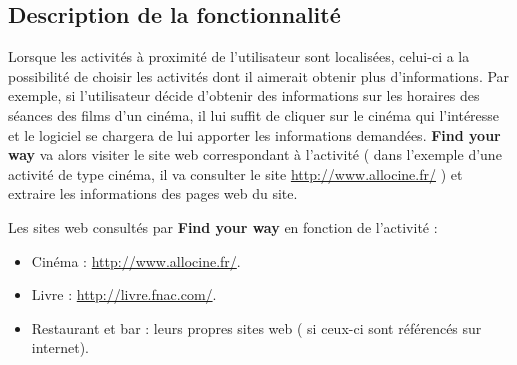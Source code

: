 \documentclass[10pt,a4paper]{report}
\begin{document}
\subsection{Description de la fonctionnalité}
\begin{flushleft}
Lorsque les activités à proximité de l'utilisateur sont localisées, celui-ci a la possibilité de choisir les activités dont il aimerait obtenir plus d'informations.
Par exemple, si l'utilisateur décide d'obtenir des informations sur les horaires des séances des films d'un cinéma, il lui suffit de cliquer sur le cinéma qui l’intéresse et le logiciel se chargera de lui apporter les informations demandées.
\textbf{Find your way} va alors visiter le site web correspondant à l'activité ( dans l'exemple d'une activité de type cinéma, il va consulter le site \url{http://www.allocine.fr/} ) et extraire les informations des pages web du site.\linebreak

Les sites web consultés par \textbf{Find your way} en fonction de l'activité :

\begin{itemize}
\item Cinéma : \url{http://www.allocine.fr/}.

\item Livre : \url{http://livre.fnac.com/}.

\item Restaurant et bar : leurs propres sites web ( si ceux-ci sont référencés sur internet).

\end{itemize}
\end{flushleft}
\end{document}
